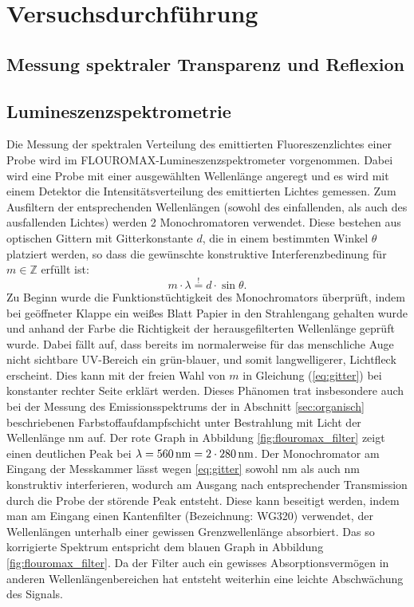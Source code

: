 \section{Versuchsdurchführung}
	\subsection{Messung spektraler Transparenz und Reflexion} \label{sec:shimadzu}
	
	\subsection{Lumineszenzspektrometrie} \label{sec:fluoromax}
	Die Messung der spektralen Verteilung des emittierten Fluoreszenzlichtes einer Probe wird im FLOUROMAX-Lumineszenzspektrometer vorgenommen. Dabei wird eine Probe mit einer ausgewählten Wellenlänge angeregt und es wird mit einem Detektor die Intensitätsverteilung des emittierten Lichtes gemessen. Zum Ausfiltern der entsprechenden Wellenlängen (sowohl des einfallenden, als auch des ausfallenden Lichtes) werden 2 Monochromatoren verwendet. Diese bestehen aus optischen Gittern mit Gitterkonstante $d$, die in einem bestimmten Winkel $\theta$ platziert werden, so dass die gewünschte konstruktive Interferenzbedinung für $m \in \mathbb{Z}$ erfüllt ist:
	\begin{equation} \label{eq:gitter}
		m \cdot \lambda \overset{!}{=} d \cdot \sin\theta.
	\end{equation}
	Zu Beginn wurde die Funktionstüchtigkeit des Monochromators überprüft, indem bei geöffneter Klappe ein weißes Blatt Papier in den Strahlengang gehalten wurde und anhand der Farbe die Richtigkeit der herausgefilterten Wellenlänge geprüft wurde. Dabei fällt auf, dass bereits im normalerweise für das menschliche Auge nicht sichtbare UV-Bereich ein grün-blauer, und somit langwelligerer, Lichtfleck erscheint. Dies kann mit der freien Wahl von $m$ in Gleichung (\ref{eq:gitter}) bei konstanter rechter Seite erklärt werden. Dieses Phänomen trat insbesondere auch bei der Messung des Emissionsspektrums der in Abschnitt \ref{sec:organisch} beschriebenen Farbstoffaufdampfschicht unter Bestrahlung mit Licht der Wellenlänge \unit[280]{nm} auf. Der rote Graph in Abbildung \ref{fig:flouromax_filter} zeigt einen deutlichen Peak bei $\lambda = \unit[560]{nm} = 2\cdot \unit[280]{nm}$. Der Monochromator am Eingang der Messkammer lässt wegen \eqref{eq:gitter} sowohl \unit[280]{nm} als auch \unit[560]{nm} konstruktiv interferieren, wodurch am Ausgang nach entsprechender Transmission durch die Probe der störende Peak entsteht. Diese kann beseitigt werden, indem man am Eingang einen Kantenfilter (Bezeichnung: WG320) verwendet, der Wellenlängen unterhalb einer gewissen Grenzwellenlänge absorbiert. Das so korrigierte Spektrum entspricht dem blauen Graph in Abbildung \ref{fig:flouromax_filter}. Da der Filter auch ein gewisses Absorptionsvermögen in anderen Wellenlängenbereichen hat entsteht weiterhin eine leichte Abschwächung des Signals.
